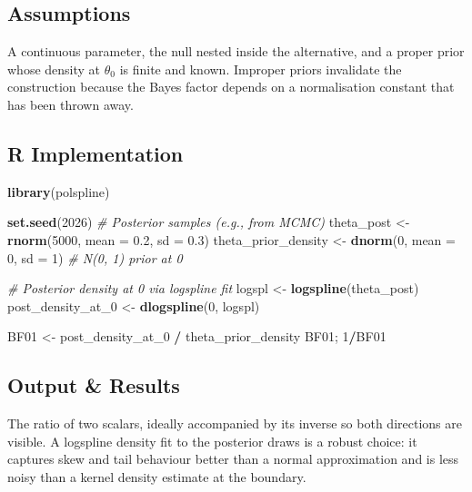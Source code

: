 \documentclass[
]{article}
\newenvironment{Shaded}{\begin{snugshade}}{\end{snugshade}}
\newcommand{\AttributeTok}[1]{\textcolor[rgb]{0.13,0.29,0.53}{#1}}
\newcommand{\CommentTok}[1]{\textcolor[rgb]{0.56,0.35,0.01}{\textit{#1}}}
\newcommand{\DecValTok}[1]{\textcolor[rgb]{0.00,0.00,0.81}{#1}}
\newcommand{\FloatTok}[1]{\textcolor[rgb]{0.00,0.00,0.81}{#1}}
\newcommand{\FunctionTok}[1]{\textcolor[rgb]{0.13,0.29,0.53}{\textbf{#1}}}
\newcommand{\NormalTok}[1]{#1}
\newcommand{\OtherTok}[1]{\textcolor[rgb]{0.56,0.35,0.01}{#1}}
\newcommand{\SpecialCharTok}[1]{\textcolor[rgb]{0.81,0.36,0.00}{\textbf{#1}}}
\begin{document}
\subsection{Assumptions}\label{assumptions}

A continuous parameter, the null nested inside the alternative, and a
proper prior whose density at \(\theta_0\) is finite and known. Improper
priors invalidate the construction because the Bayes factor depends on a
normalisation constant that has been thrown away.

\subsection{R Implementation}\label{r-implementation}

\begin{Shaded}
\begin{Highlighting}[]
\FunctionTok{library}\NormalTok{(polspline)}

\FunctionTok{set.seed}\NormalTok{(}\DecValTok{2026}\NormalTok{)}
\CommentTok{\# Posterior samples (e.g., from MCMC)}
\NormalTok{theta\_post }\OtherTok{\textless{}{-}} \FunctionTok{rnorm}\NormalTok{(}\DecValTok{5000}\NormalTok{, }\AttributeTok{mean =} \FloatTok{0.2}\NormalTok{, }\AttributeTok{sd =} \FloatTok{0.3}\NormalTok{)}
\NormalTok{theta\_prior\_density }\OtherTok{\textless{}{-}} \FunctionTok{dnorm}\NormalTok{(}\DecValTok{0}\NormalTok{, }\AttributeTok{mean =} \DecValTok{0}\NormalTok{, }\AttributeTok{sd =} \DecValTok{1}\NormalTok{)   }\CommentTok{\# N(0, 1) prior at 0}

\CommentTok{\# Posterior density at 0 via logspline fit}
\NormalTok{logspl }\OtherTok{\textless{}{-}} \FunctionTok{logspline}\NormalTok{(theta\_post)}
\NormalTok{post\_density\_at\_0 }\OtherTok{\textless{}{-}} \FunctionTok{dlogspline}\NormalTok{(}\DecValTok{0}\NormalTok{, logspl)}

\NormalTok{BF01 }\OtherTok{\textless{}{-}}\NormalTok{ post\_density\_at\_0 }\SpecialCharTok{/}\NormalTok{ theta\_prior\_density}
\NormalTok{BF01; }\DecValTok{1}\SpecialCharTok{/}\NormalTok{BF01}
\end{Highlighting}
\end{Shaded}

\subsection{Output \& Results}\label{output-results}

The ratio of two scalars, ideally accompanied by its inverse so both
directions are visible. A logspline density fit to the posterior draws
is a robust choice: it captures skew and tail behaviour better than a
normal approximation and is less noisy than a kernel density estimate at
the boundary.
\end{document}
